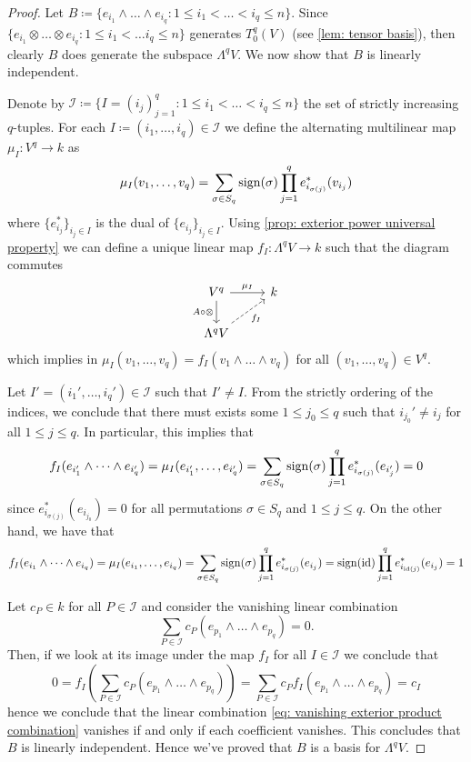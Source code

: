\begin{proof}
Let \(B \coloneq \{e_{i_1} \wedge \dots \wedge e_{i_q} \colon 1 \leq i_1 < \dots < i_q
\leq n\}\). Since \(\{e_{i_1} \otimes \dots \otimes e_{i_q} \colon 1 \leq i_1 <
\dots i_q \leq n\}\) generates \(T_0^q(V)\) (see \cref{lem: tensor basis}),
then clearly \(B\) does generate the subspace \(\Lambda^q V\). We now show
that \(B\) is linearly independent.

Denote by \(\mathcal I \coloneq \{I = (i_j)_{j=1}^q \colon 1 \leq i_1 < \dots < i_q \leq
n\}\) the set of strictly increasing \(q\)-tuples. For each \(I \coloneq (i_1,
\dots, i_q) \in \mathcal I\) we define the alternating multilinear map \(\mu_I
: V^q \to k\) as
\[
  \mu_I(v_1, \dots, v_q) = \sum_{\sigma \in S_q}
  \operatorname{sign}(\sigma) \prod_{j=1}^q e_{i_{\sigma(j)}}^*(v_{i_j})
\]
where \(\{e_{i_j}^*\}_{i_j \in I}\) is the dual of \(\{e_{i_j}\}_{i_j
\in I}\). Using \cref{prop: exterior power universal property} we can
define a unique linear map \(f_I: \Lambda^q V \to k\) such that the diagram
commutes
\[
  \begin{tikzcd}
    V^q \ar[r, "\mu_I"] \ar[d, swap, "A \circ \otimes"] &k \\
    \Lambda^q V \ar[ur, dashed, swap, "f_I"]
  \end{tikzcd}
\]
which implies in \(\mu_I(v_1, \dots, v_q) = f_I(v_1 \wedge \dots \wedge v_q)\)
for all \((v_1, \dots, v_q) \in V^q\).

Let \(I' = (i_1', \dots, i_q') \in \mathcal I\) such that \(I' \neq I\). From
the strictly ordering of the indices, we conclude that there must exists some
\(1 \leq j_0 \leq q\) such that \(i_{j_0}' \neq i_j\) for all \(1 \leq j \leq
q\). In particular, this implies that
\[
  f_I(e_{i_1'} \wedge \dots \wedge e_{i_q'}) = \mu_I(e_{i_1'}, \dots,
  e_{i_q'}) = \sum_{\sigma \in S_q} \operatorname{sign}(\sigma)
  \prod_{j=1}^q e_{i_{\sigma(j)}}^*(e_{i_j'}) = 0
\]
since \(e_{i_{\sigma(j)}}^*(e_{i_{j_0}}) = 0\) for all permutations \(\sigma
\in S_q\) and \(1 \leq j \leq q\). On the other hand, we have that
\[
  f_I(e_{i_1} \wedge \dots \wedge e_{i_q}) = \mu_I(e_{i_1}, \dots, e_{i_q})
  = \sum_{\sigma \in S_q} \operatorname{sign}(\sigma) \prod_{j=1}^q
  e_{i_{\sigma(j)}}^*(e_{i_j})
  = \operatorname{sign}(\operatorname{id}) \prod_{j=1}^q e_{i_{\operatorname{id}(j)}}^*(e_{i_j})
  = 1
\]

Let \(c_P \in k\) for all \(P \in \mathcal I\) and consider the vanishing
linear combination
\begin{equation}\label{eq: vanishing exterior product combination}
  \sum_{P \in \mathcal I} c_P (e_{p_1} \wedge \dots \wedge e_{p_q}) = 0.
\end{equation}
Then, if we look at its image under the map \(f_I\) for all \(I \in \mathcal
I\) we conclude that
\[
  0 = f_I\left( \sum_{P \in \mathcal I} c_P (e_{p_1} \wedge \dots \wedge
  e_{p_q}) \right) = \sum_{P \in \mathcal I} c_P f_I(e_{p_1} \wedge \dots \wedge
  e_{p_q}) = c_I
\]
hence we conclude that the linear combination \cref{eq: vanishing exterior
product combination} vanishes if and only if each coefficient vanishes. This
concludes that \(B\) is linearly independent. Hence we've proved that \(B\) is
a basis for \(\Lambda^q V\).
\end{proof}

